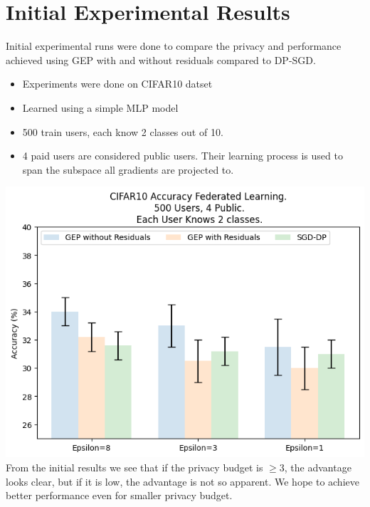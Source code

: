 \section{Initial Experimental Results}
Initial experimental runs  were done to compare the privacy and performance achieved using GEP with and without residuals compared to DP-SGD.

 \begin{itemize}
           \item Experiments were done on CIFAR10 datset
           \item Learned using a simple MLP model
           \item 500 train users, each know 2 classes out of 10.
           \item 4 paid users are considered public users. Their learning process is used to span the subspace all gradients are projected to.
 \end{itemize}
  \includegraphics[height = 0.55\textwidth]{images/cifar10_dpsgd_vs_gep.png} \\
  From the initial results we see that if the privacy budget is $ \geq 3$, the advantage looks clear, but if it is low, the advantage is not so apparent. We hope to achieve better performance even for smaller privacy budget.